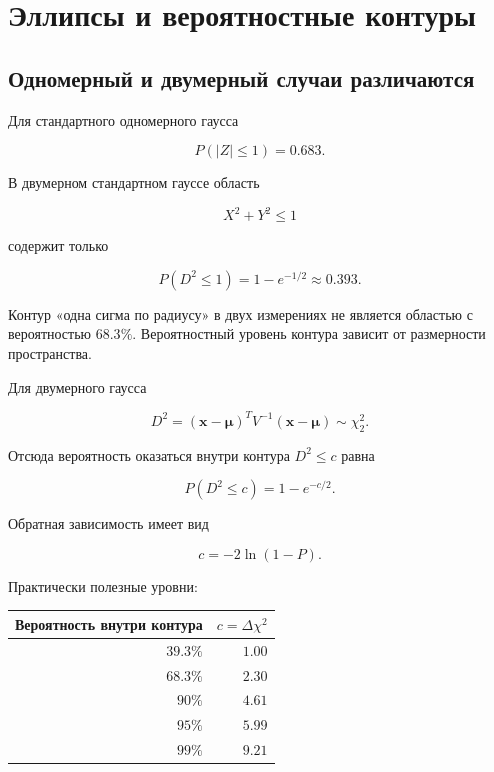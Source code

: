 \documentclass[
  russian,
  12pt,
  a4paper,
  a4paper,
  openany]{scrbook}
\newcounter{none} %
\begin{document}
\section{Эллипсы и вероятностные
контуры}\label{ux44dux43bux43bux438ux43fux441ux44b-ux438-ux432ux435ux440ux43eux44fux442ux43dux43eux441ux442ux43dux44bux435-ux43aux43eux43dux442ux443ux440ux44b}

\subsection{Одномерный и двумерный случаи
различаются}\label{ux43eux434ux43dux43eux43cux435ux440ux43dux44bux439-ux438-ux434ux432ux443ux43cux435ux440ux43dux44bux439-ux441ux43bux443ux447ux430ux438-ux440ux430ux437ux43bux438ux447ux430ux44eux442ux441ux44f}

Для стандартного одномерного гаусса

\[
P(|Z|\le1)=0.683.
\]

В двумерном стандартном гауссе область

\[
X^2+Y^2\le1
\]

содержит только

\[
\boxed{
P(D^2\le1)=1-e^{-1/2}\approx0.393.
}
\]

\begin{booknote}

Контур «одна сигма по радиусу» в двух измерениях не является областью с
вероятностью \(68.3\%\). Вероятностный уровень контура зависит от
размерности пространства.

\end{booknote}

Для двумерного гаусса

\[
D^2
=(\mathbf x-\boldsymbol\mu)^TV^{-1}(\mathbf x-\boldsymbol\mu)
\sim\chi_2^2.
\]

Отсюда вероятность оказаться внутри контура \(D^2\le c\) равна

\[
\boxed{
P(D^2\le c)=1-e^{-c/2}.
}
\]

Обратная зависимость имеет вид

\[
\boxed{
c=-2\ln(1-P).
}
\]

Практически полезные уровни:

{\def\LTcaptype{none} %
\begin{longtable}[]{@{}rr@{}}
\toprule\noalign{}
Вероятность внутри контура & \(c=\Delta\chi^2\) \\
\midrule\noalign{}
\endhead
\bottomrule\noalign{}
\endlastfoot
\(39.3\%\) & \(1.00\) \\
\(68.3\%\) & \(2.30\) \\
\(90\%\) & \(4.61\) \\
\(95\%\) & \(5.99\) \\
\(99\%\) & \(9.21\) \\
\end{longtable}
}
\end{document}

